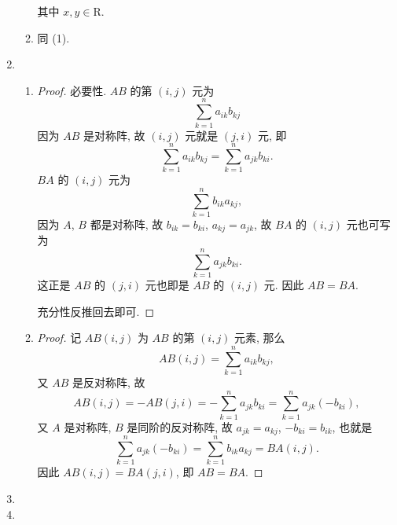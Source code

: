 \documentclass[a4paper, 11pt]{ctexart}
\begin{document}
\begin{enumerate}
\begin{enumerate}[(1)]
                其中 $x, y \in \mathrm{R}$.
            \item %
                同 (1).
        \end{enumerate}
    \item %
        \begin{enumerate}[(1)]
            \item %
                \begin{proof}
                    必要性. $AB$ 的第 $(i, j)$ 元为
                    \[
                        \sum_{k=1}^n a_{ik}b_{kj}
                    \]
                    因为 $AB$ 是对称阵, 故 $(i, j)$ 元就是 $(j, i)$ 元, 即
                    \[
                        \sum_{k=1}^n a_{ik}b_{kj} = \sum_{k=1}^n a_{jk}b_{ki}.    
                    \]
                    $BA$ 的 $(i, j)$ 元为
                    \[
                        \sum_{k=1}^n b_{ik}a_{kj},    
                    \]
                    因为 $A$, $B$ 都是对称阵, 故 $b_{ik} = b_{ki}$, $a_{kj} = a_{jk}$, 故 $BA$ 的 $(i, j)$ 元也可写为
                    \[
                        \sum_{k=1}^n a_{jk}b_{ki}.   
                    \]
                    这正是 $AB$ 的 $(j, i)$ 元也即是 $AB$ 的 $(i, j)$ 元. 因此 $AB = BA$.
                    
                    充分性反推回去即可.
                \end{proof}
            \item %
                \begin{proof}
                    记 $AB(i, j)$ 为 $AB$ 的第 $(i, j)$ 元素, 那么
                    \[
                        AB(i, j) = \sum_{k=1}^n a_{ik}b_{kj},   
                    \]
                    又 $AB$ 是反对称阵, 故
                    \[
                        AB(i, j) = -AB(j, i) = -\sum_{k=1}^n a_{jk}b_{ki} = \sum_{k=1}^n a_{jk}(-b_{ki}),  
                    \]
                    又 $A$ 是对称阵, $B$ 是同阶的反对称阵, 故 $a_{jk} = a_{kj}$, $-b_{ki} = b_{ik}$, 也就是
                    \[
                        \sum_{k=1}^n a_{jk}(-b_{ki}) = \sum_{k=1}^n b_{ik}a_{kj} = BA(i, j).    
                    \]
                    因此 $AB(i, j) = BA(j, i)$, 即 $AB = BA$.
                \end{proof}
        \end{enumerate}
    \item %
    \item %
\end{enumerate}
\end{document}

